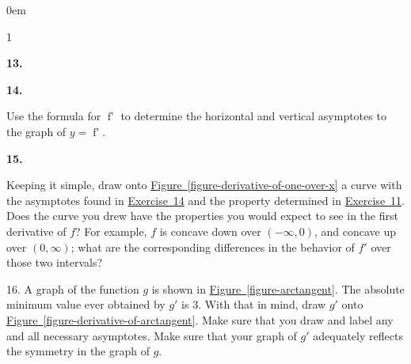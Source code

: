 \documentclass[12pt,]{book}
\theoremstyle{plain}
\theoremstyle{definition}
\numberwithin{equation}{section}
\newcounter{figstack}
\newlength\fight
\newcommand\pushValignCaptionBottom[5][b]{%
\stepcounter{figstack}%
\expandafter\def\csname %
figalign\romannumeral\value{figstack}\endcsname{#1}%
\expandafter\def\csname %
figtype\romannumeral\value{figstack}\endcsname{#2}%
\expandafter\def\csname %
figwd\romannumeral\value{figstack}\endcsname{#3}%
\expandafter\def\csname %
figcontent\romannumeral\value{figstack}\endcsname{#4}%
\expandafter\def\csname %
figcap\romannumeral\value{figstack}\endcsname{#5}%
\setbox0=\hbox{%
\begin{#2}{#3}#4\end{#2}}%
\ifdim\dimexpr\ht0+\dp0\relax>\fight\global\setlength{\fight}{%
\dimexpr\ht0+\dp0\relax}\fi%
}
\newenvironment{exercisegroup}%
{\medskip\noindent}%
{\par\bigskip}%
\newlength{\exercisegroupindent}%
\newlength{\exercisegroupitemwidth}%
\newenvironment{exercisegrouplist}%
{\vspace{-\partopsep}%
\begin{adjustwidth}{\exercisegroupindent}{0em}}%
{\end{adjustwidth}%
\vspace{-\partopsep}%
\vspace{\baselineskip}}%
\newenvironment{exercisegroupbycol}[1]%
{\begin{exercisegrouplist}%
\vspace{-\multicolsep}%
\begin{multicols}{#1}%
\setlength{\parindent}{0em}%
\setlength{\exercisegroupitemwidth}{\linewidth}}%
{\end{multicols}%
\vspace{-\multicolsep}%
\end{exercisegrouplist}}%
\newenvironment{exercisegroupitem}[1]%
{\begin{minipage}[t]{\exercisegroupitemwidth}
\vspace{0pt}%
{\bfseries#1}%
\rule{0pt}{\baselineskip}}{\strut%
\end{minipage}%
\hspace{\columnsep}}%
\providecommand\phantomsection{}
\newcommand{\fe}[2]{\mathop{{#1}{\left(#2\right)}}}
\newcommand{\ointerval}[2]{\left(#1,#2\right)}
\newcommand{\fd}[1]{#1'}
\begin{document}
\begin{exerciselist}
\begin{exercisegroup}
\begin{exercisegroupbycol}{1}
\begin{exercisegroupitem}{13. }
\end{exercisegroupitem}%
\par%
\begin{exercisegroupitem}{14. }\phantomsection\hypertarget{exercise-asymptotes-one-over-x}{\null}
Use the formula for \(\fe{\fd{f}}{x}\) to determine the horizontal and vertical asymptotes to the graph of \(y=\fe{\fd{f}}{x}\).%
\end{exercisegroupitem}%
\par%
\begin{exercisegroupitem}{15. }\phantomsection\hypertarget{exercise-224}{\null}
 Keeping it simple, draw onto \hyperref[figure-derivative-of-one-over-x]{Figure~\ref*{figure-derivative-of-one-over-x}} a curve with the asymptotes found in \hyperref[exercise-asymptotes-one-over-x]{Exercise~14} and the property determined in \hyperref[exercise-negative-derivative-of-one-over-x]{Exercise~11}. Does the curve you drew have the properties you would expect to see in the first derivative of \(f\)? For example, \(f\) is concave down over \(\ointerval{-\infty}{0}\), and concave up over \(\ointerval{0}{\infty}\); what are the corresponding differences in the behavior of \(\fd{f}\) over those two intervals?%
\end{exercisegroupitem}%
\par%
\end{exercisegroupbycol}%
\end{exercisegroup}%
\item[16.]\phantomsection\hypertarget{exercise-225}{\null}A graph of the function \(g\) is shown in \hyperref[figure-arctangent]{Figure~\ref*{figure-arctangent}}. The absolute minimum value ever obtained by \(\fd{g}\) is \(3\). With that in mind, draw \(\fd{g}\) onto \hyperref[figure-derivative-of-arctangent]{Figure~\ref*{figure-derivative-of-arctangent}}. Make sure that you draw and label any and all necessary asymptotes. Make sure that your graph of \(\fd{g}\) adequately reflects the symmetry in the graph of \(g\).%
\end{exerciselist}
\end{document}
